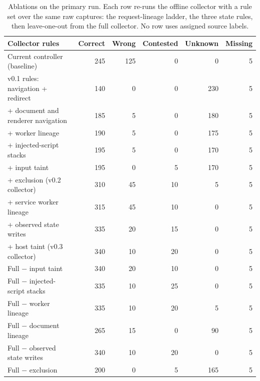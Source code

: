 \begin{table}[tb]
\centering\small
\begin{tabular}{@{}lrrrrr@{}}
\toprule
Collector rules & Correct & Wrong & Contested & Unknown & Missing \\
\midrule
Current controller (baseline) & 245 & 125 & 0 & 0 & 5 \\
v0.1 rules: navigation + redirect & 140 & 0 & 0 & 230 & 5 \\
+ document and renderer navigation & 185 & 5 & 0 & 180 & 5 \\
+ worker lineage & 190 & 5 & 0 & 175 & 5 \\
+ injected-script stacks & 195 & 5 & 0 & 170 & 5 \\
+ input taint & 195 & 0 & 5 & 170 & 5 \\
+ exclusion (v0.2 collector) & 310 & 45 & 10 & 5 & 5 \\
\midrule
+ service worker lineage & 315 & 45 & 10 & 0 & 5 \\
+ observed state writes & 335 & 20 & 15 & 0 & 5 \\
+ host taint (v0.3 collector) & 340 & 10 & 20 & 0 & 5 \\
\midrule
Full $-$ input taint & 340 & 20 & 10 & 0 & 5 \\
Full $-$ injected-script stacks & 335 & 10 & 25 & 0 & 5 \\
Full $-$ worker lineage & 335 & 10 & 20 & 5 & 5 \\
Full $-$ document lineage & 265 & 15 & 0 & 90 & 5 \\
Full $-$ observed state writes & 340 & 10 & 20 & 0 & 5 \\
Full $-$ exclusion & 200 & 0 & 5 & 165 & 5 \\
\bottomrule
\end{tabular}
\caption{Ablations on the primary run. Each row re-runs the offline collector with a rule set over the same raw captures: the request-lineage ladder, the three state rules, then leave-one-out from the full collector. No row uses assigned source labels.}
\label{tab:ablation}
\end{table}
